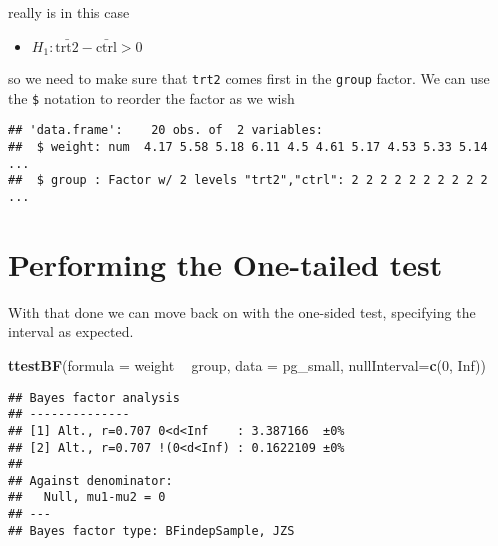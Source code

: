 \documentclass[
]{book}
\newenvironment{Shaded}{\begin{snugshade}}{\end{snugshade}}
\newcommand{\DataTypeTok}[1]{\textcolor[rgb]{0.13,0.29,0.53}{#1}}
\newcommand{\DecValTok}[1]{\textcolor[rgb]{0.00,0.00,0.81}{#1}}
\newcommand{\KeywordTok}[1]{\textcolor[rgb]{0.13,0.29,0.53}{\textbf{#1}}}
\newcommand{\NormalTok}[1]{#1}
\newcommand{\OperatorTok}[1]{\textcolor[rgb]{0.81,0.36,0.00}{\textbf{#1}}}
\newcommand{\OtherTok}[1]{\textcolor[rgb]{0.56,0.35,0.01}{#1}}
\newcommand{\StringTok}[1]{\textcolor[rgb]{0.31,0.60,0.02}{#1}}
\providecommand{\tightlist}{%
  \setlength{\itemsep}{0pt}\setlength{\parskip}{0pt}}
\begin{document}
really is in this case

\begin{itemize}
\tightlist
\item
  \(H_1 : \bar{\text{trt2}} - \bar{\text{ctrl}} > 0\)
\end{itemize}

so we need to make sure that \texttt{trt2} comes first in the \texttt{group} factor. We can use the \texttt{\$} notation to reorder the factor as we wish

\begin{Shaded}
\end{Shaded}

\begin{verbatim}
## 'data.frame':    20 obs. of  2 variables:
##  $ weight: num  4.17 5.58 5.18 6.11 4.5 4.61 5.17 4.53 5.33 5.14 ...
##  $ group : Factor w/ 2 levels "trt2","ctrl": 2 2 2 2 2 2 2 2 2 2 ...
\end{verbatim}

\hypertarget{performing-the-one-tailed-test}{%
\section{Performing the One-tailed test}\label{performing-the-one-tailed-test}}

With that done we can move back on with the one-sided test, specifying the interval as expected.

\begin{Shaded}
\begin{Highlighting}[]
\KeywordTok{ttestBF}\NormalTok{(}\DataTypeTok{formula =}\NormalTok{  weight }\OperatorTok{~}\StringTok{ }\NormalTok{group, }\DataTypeTok{data =}\NormalTok{ pg_small, }\DataTypeTok{nullInterval=}\KeywordTok{c}\NormalTok{(}\DecValTok{0}\NormalTok{, }\OtherTok{Inf}\NormalTok{))}
\end{Highlighting}
\end{Shaded}

\begin{verbatim}
## Bayes factor analysis
## --------------
## [1] Alt., r=0.707 0<d<Inf    : 3.387166  ±0%
## [2] Alt., r=0.707 !(0<d<Inf) : 0.1622109 ±0%
## 
## Against denominator:
##   Null, mu1-mu2 = 0 
## ---
## Bayes factor type: BFindepSample, JZS
\end{verbatim}
\end{document}
